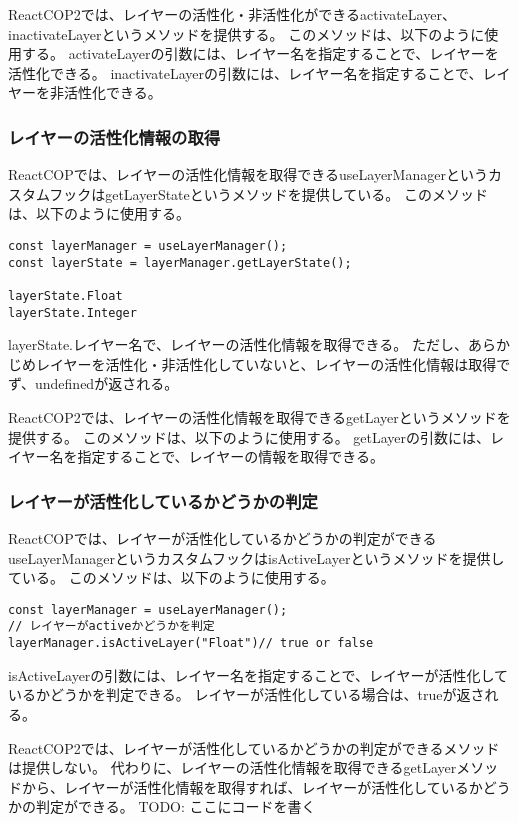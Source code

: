 \documentclass{jsarticle}
\begin{document}
ReactCOP2では、レイヤーの活性化・非活性化ができるactivateLayer、inactivateLayerというメソッドを提供する。
このメソッドは、以下のように使用する。
activateLayerの引数には、レイヤー名を指定することで、レイヤーを活性化できる。
inactivateLayerの引数には、レイヤー名を指定することで、レイヤーを非活性化できる。

\subsubsection{レイヤーの活性化情報の取得}
ReactCOPでは、レイヤーの活性化情報を取得できるuseLayerManagerというカスタムフックはgetLayerStateというメソッドを提供している。
このメソッドは、以下のように使用する。
\begin{lstlisting}[]
const layerManager = useLayerManager();
const layerState = layerManager.getLayerState();

layerState.Float
layerState.Integer
\end{lstlisting}
layerState.{レイヤー名}で、レイヤーの活性化情報を取得できる。
ただし、あらかじめレイヤーを活性化・非活性化していないと、レイヤーの活性化情報は取得でず、undefinedが返される。

ReactCOP2では、レイヤーの活性化情報を取得できるgetLayerというメソッドを提供する。%
このメソッドは、以下のように使用する。
getLayerの引数には、レイヤー名を指定することで、レイヤーの情報を取得できる。

\subsubsection{レイヤーが活性化しているかどうかの判定}
ReactCOPでは、レイヤーが活性化しているかどうかの判定ができるuseLayerManagerというカスタムフックはisActiveLayerというメソッドを提供している。
このメソッドは、以下のように使用する。
\begin{lstlisting}[]
const layerManager = useLayerManager();
// レイヤーがactiveかどうかを判定
layerManager.isActiveLayer("Float")// true or false
\end{lstlisting}
isActiveLayerの引数には、レイヤー名を指定することで、レイヤーが活性化しているかどうかを判定できる。
レイヤーが活性化している場合は、trueが返される。

ReactCOP2では、レイヤーが活性化しているかどうかの判定ができるメソッドは提供しない。
代わりに、レイヤーの活性化情報を取得できるgetLayerメソッドから、レイヤーが活性化情報を取得すれば、レイヤーが活性化しているかどうかの判定ができる。
TODO: ここにコードを書く
\end{document}
